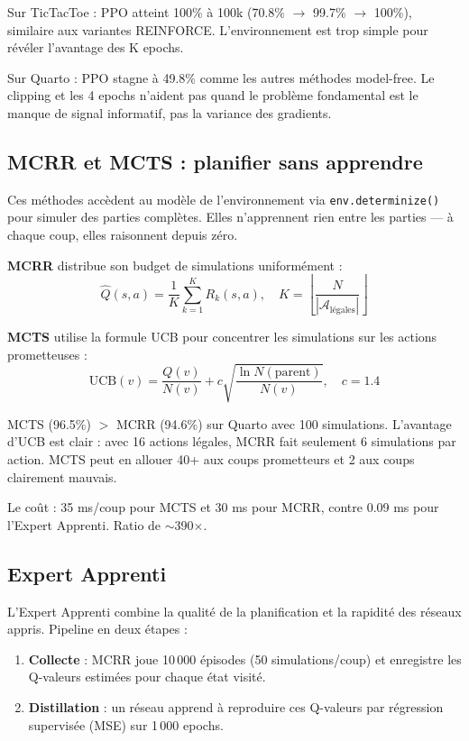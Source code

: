 \documentclass[12pt,a4paper]{article}
\begin{document}
\begin{observationbox}
Sur TicTacToe : PPO atteint 100\% à 100k (70.8\% $\to$ 99.7\% $\to$ 100\%), similaire aux variantes REINFORCE. L'environnement est trop simple pour révéler l'avantage des K epochs.

Sur Quarto : PPO stagne à 49.8\% comme les autres méthodes model-free. Le clipping et les 4 epochs n'aident pas quand le problème fondamental est le manque de signal informatif, pas la variance des gradients.
\end{observationbox}

\subsection{MCRR et MCTS : planifier sans apprendre}

Ces méthodes accèdent au modèle de l'environnement via \texttt{env.determinize()} pour simuler des parties complètes. Elles n'apprennent rien entre les parties — à chaque coup, elles raisonnent depuis zéro.

\textbf{MCRR} distribue son budget de simulations uniformément :
\[
\hat{Q}(s, a) = \frac{1}{K}\sum_{k=1}^{K} R_k(s, a), \quad K = \left\lfloor\frac{N}{|\mathcal{A}_\text{légales}|}\right\rfloor
\]

\textbf{MCTS} utilise la formule UCB pour concentrer les simulations sur les actions prometteuses :
\[
\text{UCB}(v) = \frac{Q(v)}{N(v)} + c\sqrt{\frac{\ln N(\text{parent})}{N(v)}}, \quad c = 1.4
\]

\begin{observationbox}
MCTS (96.5\%) $>$ MCRR (94.6\%) sur Quarto avec 100 simulations. L'avantage d'UCB est clair : avec 16 actions légales, MCRR fait seulement 6 simulations par action. MCTS peut en allouer 40+ aux coups prometteurs et 2 aux coups clairement mauvais.

Le coût : 35 ms/coup pour MCTS et 30 ms pour MCRR, contre 0.09 ms pour l'Expert Apprenti. Ratio de $\sim$390$\times$.
\end{observationbox}

\subsection{Expert Apprenti}

L'Expert Apprenti combine la qualité de la planification et la rapidité des réseaux appris. Pipeline en deux étapes :

\begin{enumerate}
  \item \textbf{Collecte} : MCRR joue 10\,000 épisodes (50 simulations/coup) et enregistre les Q-valeurs estimées pour chaque état visité.
  \item \textbf{Distillation} : un réseau apprend à reproduire ces Q-valeurs par régression supervisée (MSE) sur 1\,000 epochs.
\end{enumerate}
\end{document}
